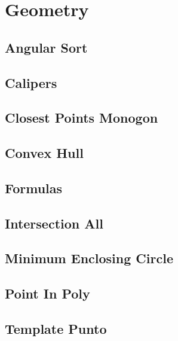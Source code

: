 \documentclass[9pt,portrait,twocolumn,a4paper,notitlepage]{article}
\newcommand\cppfile[2][]{%
\ifstrempty{#1}{}{}%
}
\begin{document}

\section{Geometry}

\subsection{Angular Sort}
\cppfile{geometry_clean/angular_sort.cpp}

\subsection{Calipers}
\cppfile{geometry_clean/calipers.cpp}

\subsection{Closest Points Monogon}
\cppfile{geometry_clean/closest_points_Monogon.cpp}

\subsection{Convex Hull}
\cppfile{geometry_clean/convex_hull.cpp}

\subsection{Formulas}
\cppfile{geometry_clean/formulas.cpp}

\subsection{Intersection All}
\cppfile{geometry_clean/intersection_all.cpp}

\subsection{Minimum Enclosing Circle}
\cppfile{geometry_clean/minimum_enclosing_circle.cpp}

\subsection{Point In Poly}
\cppfile{geometry_clean/point_in_poly.cpp}

\subsection{Template Punto}
\cppfile{geometry_clean/template_punto.cpp}
\end{document}
